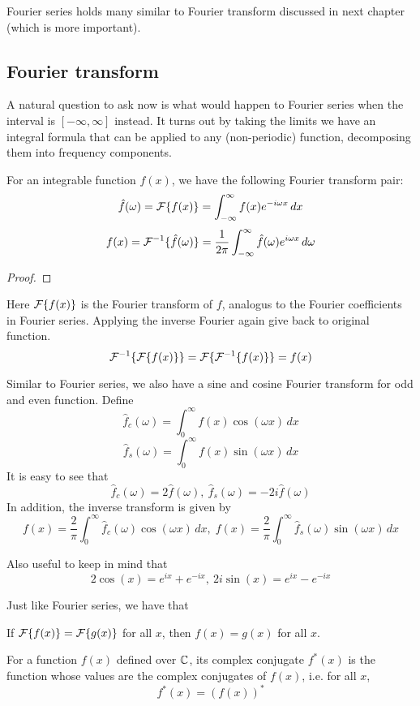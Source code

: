 \documentclass[11pt]{article}
\begin{document}
Fourier series holds many similar to Fourier transform discussed in next chapter (which is more important).

\subsection{Fourier transform}
A natural question to ask now is what would happen to Fourier series when the interval is \([-\infty,\infty]\) instead. It turns out by taking the limits we have an integral formula that can be applied to any (non-periodic) function, decomposing them into frequency components.

\begin{theorem}
  For an integrable function \(f(x)\), we have the following Fourier transform pair:
  \[\hat{f}(\omega)=\cal{F}\{f(x)\}=\int_{-\infty}^{\infty}f(x)e^{-i\omega x}\,dx\]
  \[f(x)=\cal{F}^{-1}\{\hat{f}(\omega)\}=\frac{1}{2\pi}\int_{-\infty}^{\infty}\hat{f}(\omega)e^{i\omega x}\,d\omega\]
\end{theorem}
\begin{proof}
  
\end{proof}
Here \(\cal{F}\{f(x)\}\) is the Fourier transform of \(f\), analogus to the Fourier coefficients in Fourier series. Applying the inverse Fourier again give back to original function.
\[\cal{F}^{-1}\{\cal{F}\{f(x)\}\}=\cal{F}\{\cal{F}^{-1}\{f(x)\}\}=f(x)\]

Similar to Fourier series, we also have a sine and cosine Fourier transform for odd and even function. Define
\[\hat{f}_c(\omega)=\int_{0}^{\infty}f(x)\cos(\omega x)\,dx\]
\[\hat{f}_s(\omega)=\int_{0}^{\infty}f(x)\sin(\omega x)\,dx\]
It is easy to see that
\[\hat{f}_c(\omega)=2\hat{f}(\omega),\:\hat{f}_s(\omega)=-2i\hat{f}(\omega)\]
In addition, the inverse transform is given by
\[f(x)=\frac{2}{\pi}\int_{0}^{\infty}\hat{f}_c(\omega)\cos(\omega x)\,dx,\; f(x)=\frac{2}{\pi}\int_{0}^{\infty}\hat{f}_s(\omega)\sin(\omega x)\,dx\]

Also useful to keep in mind that
\[2\cos(x)=e^{ix}+e^{-ix},\: 2i\sin(x)=e^{ix}-e^{-ix}\]

Just like Fourier series, we have that
\begin{theorem}[Uniqueness]
  If \(\cal{F}\{f(x)\}=\cal{F}\{g(x)\}\) for all \(x\), then \(f(x)=g(x)\) for all \(x\).
\end{theorem}

\begin{definition}
  For a function \(f(x)\) defined over \(\C\), its complex conjugate \(f^*(x)\) is the function whose values are the complex conjugates of \(f(x)\), i.e. for all \(x\),
  \[f^*(x)=(f(x))^*\]
\end{definition}
\end{document}
